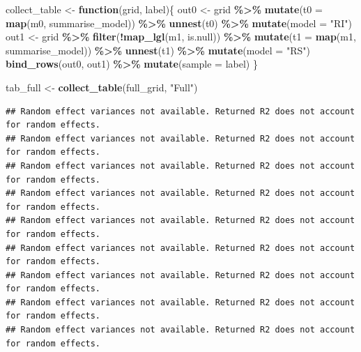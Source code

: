 \documentclass[
  10pt,
]{article}
\newenvironment{Shaded}{\begin{snugshade}}{\end{snugshade}}
\newcommand{\AttributeTok}[1]{\textcolor[rgb]{0.13,0.29,0.53}{#1}}
\newcommand{\ControlFlowTok}[1]{\textcolor[rgb]{0.13,0.29,0.53}{\textbf{#1}}}
\newcommand{\FunctionTok}[1]{\textcolor[rgb]{0.13,0.29,0.53}{\textbf{#1}}}
\newcommand{\NormalTok}[1]{#1}
\newcommand{\OtherTok}[1]{\textcolor[rgb]{0.56,0.35,0.01}{#1}}
\newcommand{\SpecialCharTok}[1]{\textcolor[rgb]{0.81,0.36,0.00}{\textbf{#1}}}
\newcommand{\StringTok}[1]{\textcolor[rgb]{0.31,0.60,0.02}{#1}}
\begin{document}
\begin{Shaded}
\begin{Highlighting}[]
\NormalTok{collect\_table }\OtherTok{\textless{}{-}} \ControlFlowTok{function}\NormalTok{(grid, label)\{}
\NormalTok{  out0 }\OtherTok{\textless{}{-}}\NormalTok{ grid }\SpecialCharTok{\%\textgreater{}\%} \FunctionTok{mutate}\NormalTok{(}\AttributeTok{t0 =} \FunctionTok{map}\NormalTok{(m0, summarise\_model)) }\SpecialCharTok{\%\textgreater{}\%} \FunctionTok{unnest}\NormalTok{(t0) }\SpecialCharTok{\%\textgreater{}\%} \FunctionTok{mutate}\NormalTok{(}\AttributeTok{model =} \StringTok{"RI"}\NormalTok{)}
\NormalTok{  out1 }\OtherTok{\textless{}{-}}\NormalTok{ grid }\SpecialCharTok{\%\textgreater{}\%} \FunctionTok{filter}\NormalTok{(}\SpecialCharTok{!}\FunctionTok{map\_lgl}\NormalTok{(m1, is.null)) }\SpecialCharTok{\%\textgreater{}\%} \FunctionTok{mutate}\NormalTok{(}\AttributeTok{t1 =} \FunctionTok{map}\NormalTok{(m1, summarise\_model)) }\SpecialCharTok{\%\textgreater{}\%} \FunctionTok{unnest}\NormalTok{(t1) }\SpecialCharTok{\%\textgreater{}\%} \FunctionTok{mutate}\NormalTok{(}\AttributeTok{model =} \StringTok{"RS"}\NormalTok{)}
  \FunctionTok{bind\_rows}\NormalTok{(out0, out1) }\SpecialCharTok{\%\textgreater{}\%} \FunctionTok{mutate}\NormalTok{(}\AttributeTok{sample =}\NormalTok{ label)}
\NormalTok{\}}

\NormalTok{tab\_full }\OtherTok{\textless{}{-}} \FunctionTok{collect\_table}\NormalTok{(full\_grid, }\StringTok{"Full"}\NormalTok{)}
\end{Highlighting}
\end{Shaded}

\begin{verbatim}
## Random effect variances not available. Returned R2 does not account for random effects.
## Random effect variances not available. Returned R2 does not account for random effects.
## Random effect variances not available. Returned R2 does not account for random effects.
## Random effect variances not available. Returned R2 does not account for random effects.
## Random effect variances not available. Returned R2 does not account for random effects.
## Random effect variances not available. Returned R2 does not account for random effects.
## Random effect variances not available. Returned R2 does not account for random effects.
## Random effect variances not available. Returned R2 does not account for random effects.
## Random effect variances not available. Returned R2 does not account for random effects.
\end{verbatim}
\end{document}

